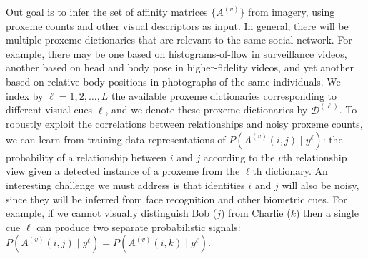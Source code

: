 Out goal is to infer the set of affinity matrices $\{A^{(v)}\}$ from imagery, using proxeme counts and other visual descriptors as input. In general, there will be multiple proxeme dictionaries that are relevant to the same social network. For example, there may be one based on histograms-of-flow in surveillance videos, another based on head and body pose in higher-fidelity videos, and yet another based on relative body positions in photographs of the same individuals. We index by $\ell=1,2,\ldots,L$ the available proxeme dictionaries corresponding to different visual cues $\ell$, and we denote these proxeme dictionaries by $\mathcal{D}^{(\ell)}$. To robustly exploit the correlations between relationships and noisy proxeme counts,
we can learn from training data representations of  $P(A^{(v)}(i,j) \mid y^\ell)$: the probability of a relationship between $i$ and $j$ according to the $v$th relationship view given a detected instance of a proxeme from the $\ell$th dictionary. An interesting challenge we must address is that identities $i$ and $j$ will also be noisy, since they will be inferred from face recognition and other biometric cues. For example, if we cannot visually distinguish Bob ($j$) from Charlie ($k$) then a single cue $\ell$ can produce two separate probabilistic signals: $P(A^{(v)}(i,j) \mid y^\ell)=P(A^{(v)}(i,k) \mid y^\ell)$. 


